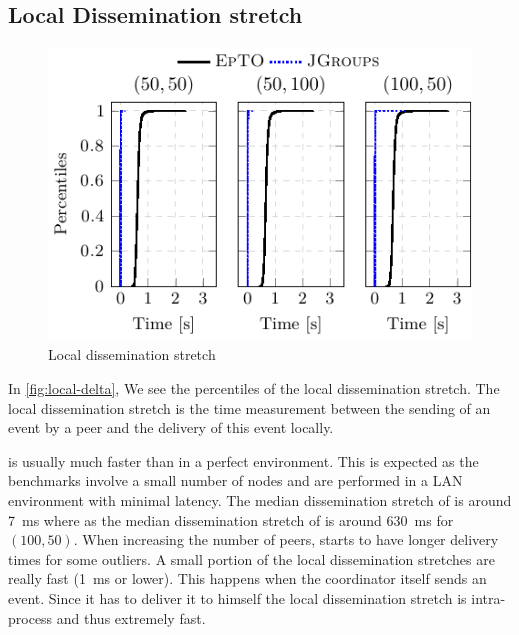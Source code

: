\subsection{Local Dissemination stretch}
 \begin{figure}[hpt]
 	\centering
 	\includegraphics[width=\linewidth]{figures/local-diss-stretch-nochurn.pdf}
 	\vspace{-2mm} 
 	\caption{Local dissemination stretch}
 	\vspace{-2mm}
 	\label{fig:local-delta}  
 \end{figure}
In \autoref{fig:local-delta}, We see the percentiles of the local dissemination stretch. The local dissemination stretch is the time measurement between the sending of an event by a peer and the delivery of this event locally.
\par
\jgroups is usually much faster than \epto in a perfect environment. This is expected as the benchmarks involve a small number of nodes and are performed in a LAN environment with minimal latency. The median dissemination stretch of \jgroups is around \SI{7}{\milli\second} where as the median dissemination stretch of \epto is around \SI{630}{\milli\second} for $(100,50)$. When increasing the number of peers, \jgroups starts to have longer delivery times for some outliers. A small portion of the local dissemination stretches are really fast (\SI{1}{\milli\second} or lower). This happens when the coordinator itself sends an event. Since it has to deliver it to himself the local dissemination stretch is intra-process and thus extremely fast.

